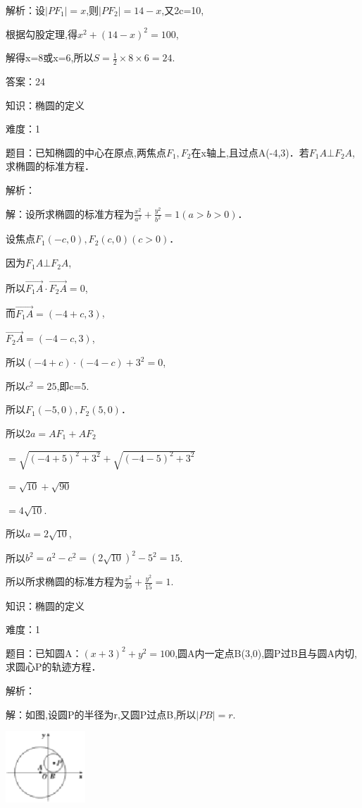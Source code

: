 \documentclass{article} %
\begin{document}
解析：设$|PF_{1}|=x$,则$|PF_2|=14-x$,又2c=10,

根据勾股定理,得$x^{2}+(14-x)^{2}=100$,

解得x=8或x=6,所以$S=\frac{1}{2}{\times}8{\times}6=24$.

答案：24



知识：椭圆的定义

难度：1

题目：已知椭圆的中心在原点,两焦点$F_{1},F_{2}$在x轴上,且过点A(-4,3)．若$F_{1}A{\bot}F_{2}A$,求椭圆的标准方程．

解析：

解：设所求椭圆的标准方程为$\frac{x^2}{a^2}+\frac{y^2}{b^2}=1(a>b>0)$．

设焦点$F_{1}(-c,0),F_{2}(c,0)(c{>}0)$．

因为$F_{1}A{\bot}F_{2}A$,

所以$\overrightarrow{F_1A}·\overrightarrow{F_2A}=0$,

而$\overrightarrow{F_1A}=(-4+c,3)$,

$\overrightarrow{F_2A}=(-4-c,3)$,

所以$(-4+c)\cdot (-4-c)+3^{2}=0$,

所以$c^{2}=25$,即c=5.

所以$F_{1}(-5,0),F_{2}(5,0)$．

所以$2a=AF_{1}+AF_{2}$

$=\sqrt{(-4+5)^2+3^2}+\sqrt{(-4-5)^2+3^2}$

$=\sqrt{10}+\sqrt{90}$

$=4\sqrt{10}$.

所以$a=2\sqrt{10}$,

所以$b^{2}=a^{2}-c^{2}=(2\sqrt{10})^{2}-5^{2}=15$.

所以所求椭圆的标准方程为$\frac{x^2}{40}+\frac{y^2}{15}=1$.



知识：椭圆的定义

难度：1

题目：已知圆A：$(x+3)^{2}+y^{2}=100$,圆A内一定点B(3,0),圆P过B且与圆A内切,求圆心P的轨迹方程．

解析：

解：如图,设圆P的半径为r,又圆P过点B,所以$|PB|=r$.

\includegraphics*[width=1.18in, height=1.05in, keepaspectratio=false]{image4}
\end{document}
